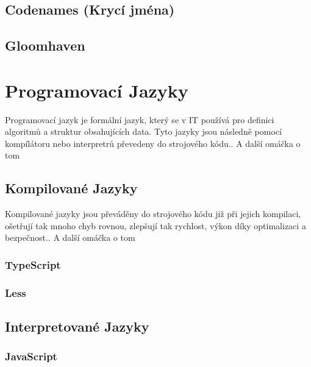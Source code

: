 \subsection{Codenames (Krycí jména)}
\label{subsec:popular-board-games-analysis-codenames}

\subsection{Gloomhaven}
\label{subsec:popular-board-games-analysis-gloomhaven}

\section{Programovací Jazyky}
\label{sec:languages}
Programovací jazyk je formální jazyk, který se v IT používá pro definici algoritmů a struktur obsahujících data. Tyto jazyky jsou následně pomocí kompílátoru nebo interpretrů převedeny do strojového kódu.. A další omáčka o tom

\subsection{Kompilované Jazyky}
\label{subsec:languages-compiled}
Kompilované jazyky jsou převáděny do strojového kódu již při jejich kompilaci, ošetřují tak mnoho chyb rovnou, zlepšují tak rychlost, výkon díky optimalizaci a bezpečnost.. A další omáčka o tom

\subsubsection{TypeScript}
\label{subsubsec:languages-compiled-typescript}

\subsubsection{Less}
\label{subsubsec:languages-compiled-less}

\subsection{Interpretované Jazyky}
\label{subsec:languages-interpreted}

\subsubsection{JavaScript}
\label{subsubsec:languages-interpreted-javascript}

